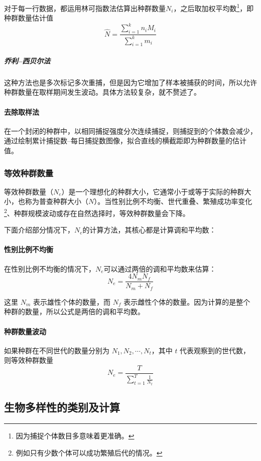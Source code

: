对于每一行数据，都运用林可指数法估算出种群数量$N_{i}$，之后取加权平均数\footnote{因为捕捉个体数目多意味着更准确。}，即种群数量估计值\[\hat{N}=\frac{\sum\limits_{i=1}^{k}n_{i}M_{i}}{\sum\limits_{i=1}^{k}m_{i}}\]

\subparagraph{乔利--西贝尔法}

这种方法也是多次标记多次重捕，但是因为它增加了样本被捕获的时间，所以允许种群数量在取样期间发生波动。具体方法较复杂，就不赘述了。

\paragraph{去除取样法}

在一个封闭的种群中，以相同捕捉强度分次连续捕捉，则捕捉到的个体数会减少，通过绘制累计捕捉数--每日捕捉数图像，拟合直线的横截距即为种群数量的估计值。

\subsubsection{等效种群数量}

等效种群数量（$N_e$）是一个理想化的种群大小，它通常小于或等于实际的种群大小，也称为普查种群大小（$N$）。当性别比例不均衡、世代重叠、繁殖成功率变化\footnote{例如只有少数个体可以成功繁殖后代的情况。}、种群规模波动或存在自然选择时，等效种群数量会下降。

下面介绍部分情况下，$N_e$的计算方法，其核心都是计算调和平均数：

\paragraph{性别比例不均衡} 

在性别比例不均衡的情况下，$N_e$可以通过两倍的调和平均数来估算：
\[N_e = \frac{4N_mN_f}{N_m + N_f}\]

这里 $N_m$ 表示雄性个体的数量，而 $N_f$ 表示雌性个体的数量。因为计算的是整个种群的数量，所以公式是两倍的调和平均数。

\paragraph{种群数量波动} 

如果种群在不同世代的数量分别为 $N_1, N_2, \cdots, N_t$，其中 $t$ 代表观察到的世代数，则等效种群数量
\[N_e = \frac{T}{\sum_{t=1}^{T} \frac{1}{N_t}}\]



\subsection{生物多样性的类别及计算}
